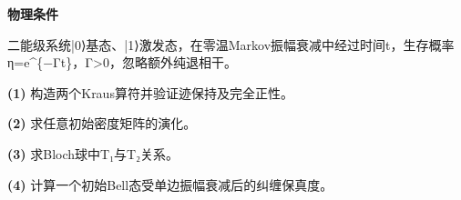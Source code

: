 \textbf{物理条件}\par 二能级系统|0⟩基态、|1⟩激发态，在零温Markov振幅衰减中经过时间t，生存概率η=e\textasciicircum{}\{−Γt\}，Γ>0，忽略额外纯退相干。
\par\noindent\textbf{(1)} 构造两个Kraus算符并验证迹保持及完全正性。
\par\noindent\textbf{(2)} 求任意初始密度矩阵的演化。
\par\noindent\textbf{(3)} 求Bloch球中T₁与T₂关系。
\par\noindent\textbf{(4)} 计算一个初始Bell态受单边振幅衰减后的纠缠保真度。
